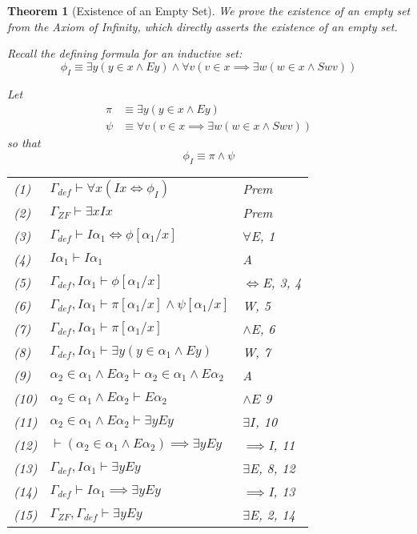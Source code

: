 \documentclass[12pt]{article}
\theoremstyle{break}
\theoremstyle{break}
\newtheorem{theorem}{Theorem}[section]
\theoremstyle{break}
\theoremstyle{break}
\theoremstyle{break}
\newtheorem{informal definition}[definition]{Informal Definition}
\begin{document}
\begin{theorem}[Existence of an Empty Set]
We prove the existence of an empty set from the Axiom of Infinity, which directly asserts the existence of an empty set.

Recall the defining formula for an inductive set:
$$
\phi_I \equiv \exists y(y\in x \land Ey) \land \forall v (v \in x \implies \exists w(w\in x \land Swv))
$$

Let
\begin{align}
\pi &\equiv \exists y (y\in x \land Ey)\\
\psi &\equiv \forall v (v \in x \implies \exists w(w\in x \land Swv))
\end{align}
so that
$$
\phi_I \equiv \pi \land \psi
$$

\begin{center}
\begin{tabular}{ p{2cm} p{8cm} p{3cm} }
(1) & $\Gamma_{def} \vdash \forall x (Ix \iff \phi_I)$ & Prem \\
(2) & $\Gamma_{ZF} \vdash \exists x Ix$ & Prem\\
(3) & $\Gamma_{def} \vdash I\alpha_1 \iff \phi[\alpha_1/x]$ & $\forall$E, 1 \\
(4) & $I\alpha_1 \vdash I\alpha_1$ & A \\
(5) & $\Gamma_{def}, I\alpha_1 \vdash \phi[\alpha_1/x]$ & $\iff$E, 3, 4\\
(6) & $\Gamma_{def}, I\alpha_1 \vdash \pi[\alpha_1/x]\land \psi[\alpha_1/x]$ & W, 5\\
(7) & $\Gamma_{def}, I\alpha_1 \vdash \pi[\alpha_1/x]$ & $\land$E, 6\\
(8) & $\Gamma_{def}, I\alpha_1 \vdash \exists y(y\in \alpha_1 \land Ey)$ & W, 7\\
(9) & $\alpha_2\in\alpha_1 \land E\alpha_2\vdash \alpha_2\in\alpha_1 \land E\alpha_2$ & A\\
(10) & $\alpha_2\in\alpha_1\land E\alpha_2\vdash E\alpha_2$ & $\land E$ 9\\
(11) & $\alpha_2\in\alpha_1 \land E\alpha_2 \vdash \exists y Ey$ & $\exists I$, 10\\
(12) & $\vdash (\alpha_2\in \alpha_1 \land E\alpha_2)\implies \exists y Ey$ & $\implies$I, 11\\
(13) & $\Gamma_{def}, I\alpha_1 \vdash \exists y Ey$ & $\exists$E, 8, 12\\
(14) & $\Gamma_{def} \vdash I\alpha_1 \implies \exists y Ey$ & $\implies$I, 13\\
(15) & $\Gamma_{ZF}, \Gamma_{def} \vdash \exists y Ey$ & $\exists$E, 2, 14
\end{tabular}
\end{center}
\end{theorem}
\end{document}
